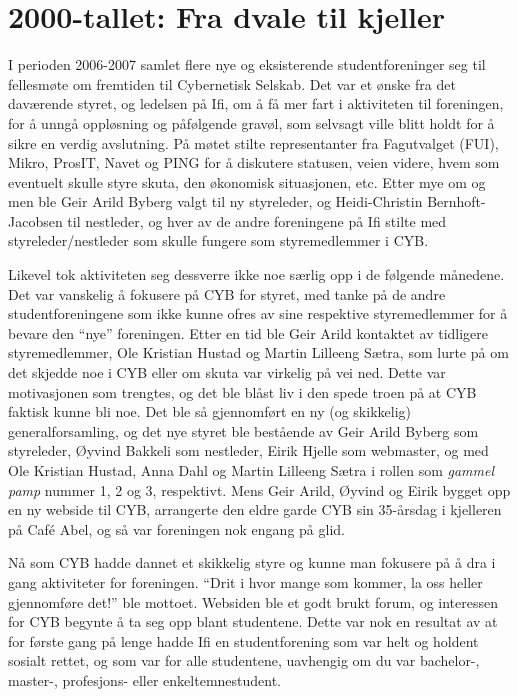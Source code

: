 \chapter[Fra dvale til kjeller]{2000-tallet: Fra dvale til kjeller}

\author{Skrevet av Geir Arild Byberg}

I perioden 2006-2007 samlet flere nye og eksisterende studentforeninger seg til fellesmøte om fremtiden til Cybernetisk Selskab. Det var et ønske fra det daværende styret, og ledelsen på Ifi, om å få mer fart i aktiviteten til foreningen, for å unngå oppløsning og påfølgende gravøl, som selvsagt ville blitt holdt for å sikre en verdig avslutning. På møtet stilte representanter fra Fagutvalget (FUI), Mikro, ProsIT, Navet og PING for å diskutere statusen, veien videre, hvem som eventuelt skulle styre skuta, den økonomisk situasjonen, etc. Etter mye om og men ble Geir Arild Byberg valgt til ny styreleder, og Heidi-Christin Bernhoft-Jacobsen til nestleder, og hver av de andre foreningene på Ifi stilte med styreleder\slash nestleder som skulle fungere som styremedlemmer i CYB.

Likevel tok aktiviteten seg dessverre ikke noe særlig opp i de følgende månedene. Det var vanskelig å fokusere på CYB for styret, med tanke på de andre studentforeningene som ikke kunne ofres av sine respektive styremedlemmer for å bevare den ``nye'' foreningen. Etter en tid ble Geir Arild kontaktet av tidligere styremedlemmer, Ole Kristian Hustad og Martin Lilleeng Sætra, som lurte på om det skjedde noe i CYB eller om skuta var virkelig på vei ned. Dette var motivasjonen som trengtes, og det ble blåst liv i den spede troen på at CYB faktisk kunne bli noe. Det ble så gjennomført en ny (og skikkelig) generalforsamling, og det nye styret ble bestående av Geir Arild Byberg som styreleder, Øyvind Bakkeli som nestleder, Eirik Hjelle som webmaster, og med Ole Kristian Hustad, Anna Dahl og Martin Lilleeng Sætra i rollen som \textit{gammel pamp} nummer 1, 2 og 3, respektivt. Mens Geir Arild, Øyvind og Eirik bygget opp en ny webside til CYB, arrangerte den eldre garde CYB sin 35-årsdag i kjelleren på Café Abel, og så var foreningen nok engang på glid.

Nå som CYB hadde dannet et skikkelig styre og kunne man fokusere på å dra i gang aktiviteter for foreningen. ``Drit i hvor mange som kommer, la oss heller gjennomføre det!'' ble mottoet. Websiden ble et godt brukt forum, og interessen for CYB begynte å ta seg opp blant studentene. Dette var nok en resultat av at for første gang på lenge hadde Ifi en studentforening som var helt og holdent sosialt rettet, og som var for alle studentene, uavhengig om du var bachelor-, master-, profesjons- eller enkeltemnestudent.

